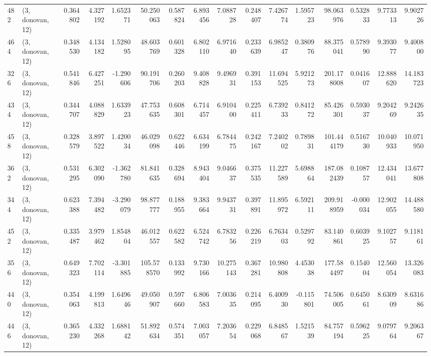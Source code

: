 \begin{tabular}{llrrrrrrrrrrrrrr}
482 &  (3, donovan, 12) &   0.364802 &   4.327192 &   1.652371 &    50.250063 &   0.587824 &   6.893456 &   7.088728 &  0.248407 &   7.426774 &   1.595723 &    98.063976 &   0.532833 &   9.773313 &   9.902726 \\
464 &  (3, donovan, 12) &   0.348530 &   4.134182 &   1.528095 &    48.603769 &   0.601328 &   6.802110 &   6.971640 &  0.233639 &   6.985247 &   0.380976 &    88.375041 &   0.578990 &   9.393077 &   9.400800 \\
326 &  (3, donovan, 12) &   0.541846 &   6.427251 &  -1.290606 &    90.191706 &   0.260203 &   9.408828 &   9.496931 &  0.391153 &  11.694525 &   5.921273 &   201.178008 &   0.041607 &  12.888620 &  14.183723 \\
434 &  (3, donovan, 12) &   0.344707 &   4.088829 &   1.633923 &    47.753635 &   0.608301 &   6.714457 &   6.910400 &  0.225411 &   6.739233 &   0.841272 &    85.426301 &   0.593037 &   9.204269 &   9.242635 \\
458 &  (3, donovan, 12) &   0.328579 &   3.897522 &   1.420034 &    46.029098 &   0.622446 &   6.634199 &   6.784475 &  0.242167 &   7.240202 &   0.789831 &   101.444179 &   0.516730 &  10.040933 &  10.071950 \\
362 &  (3, donovan, 12) &   0.531295 &   6.302090 &  -1.362780 &    81.841635 &   0.328694 &   8.943404 &   9.046637 &  0.375535 &  11.227589 &   5.698864 &   187.082439 &   0.108757 &  12.434041 &  13.677808 \\
344 &  (3, donovan, 12) &   0.623388 &   7.394482 &  -3.290079 &    98.877777 &   0.188955 &   9.383664 &   9.943731 &  0.397891 &  11.895972 &   6.592111 &   209.918959 &  -0.000034 &  12.902055 &  14.488580 \\
452 &  (3, donovan, 12) &   0.335487 &   3.979462 &   1.854804 &    46.012557 &   0.622582 &   6.524742 &   6.783256 &  0.226219 &   6.763403 &   0.529792 &    83.140861 &   0.603925 &   9.102757 &   9.118161 \\
356 &  (3, donovan, 12) &   0.649323 &   7.702114 &  -3.301885 &   105.578570 &   0.133992 &   9.730166 &  10.275143 &  0.367281 &  10.980808 &   4.453038 &   177.584497 &   0.154004 &  12.560054 &  13.326083 \\
440 &  (3, donovan, 12) &   0.354063 &   4.199813 &   1.649646 &    49.050907 &   0.597660 &   6.806583 &   7.003635 &  0.214095 &   6.400930 &  -0.115801 &    74.506005 &   0.645061 &   8.630909 &   8.631686 \\
446 &  (3, donovan, 12) &   0.365230 &   4.332268 &   1.688142 &    51.892634 &   0.574351 &   7.003057 &   7.203654 &  0.229068 &   6.848567 &   1.521539 &    84.757194 &   0.596225 &   9.079764 &   9.206367 \\

\end{tabular}
